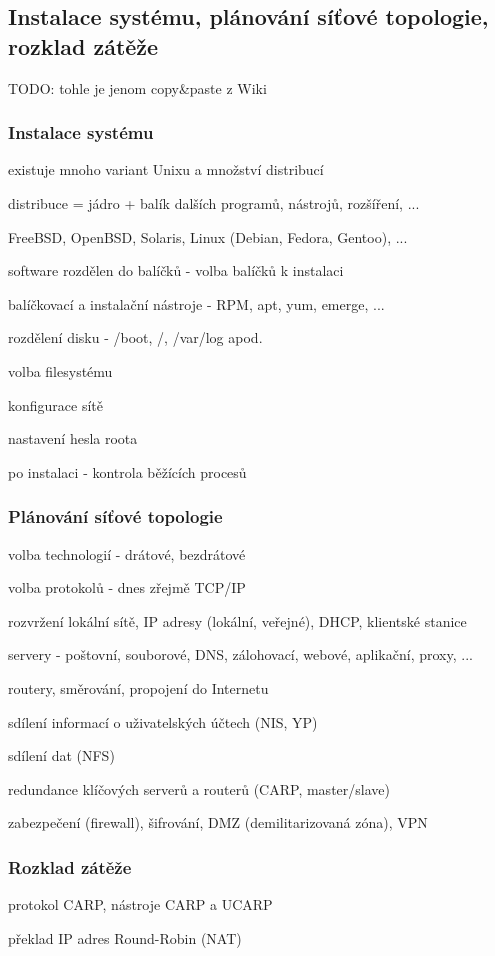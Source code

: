 \subsection{Instalace systému, plánování síťové topologie, rozklad zátěže}

TODO: tohle je jenom copy\&paste z Wiki

\subsubsection*{Instalace systému}

\begin{pitemize}
    \item existuje mnoho variant Unixu a množství distribucí
    \item distribuce = jádro + balík dalších programů, nástrojů, rozšíření, ...
    \item FreeBSD, OpenBSD, Solaris, Linux (Debian, Fedora, Gentoo), ...
    \item software rozdělen do balíčků - volba balíčků k instalaci
    \item balíčkovací a instalační nástroje - RPM, apt, yum, emerge, ...
    \item rozdělení disku - /boot, /, /var/log apod.
    \item volba filesystému
    \item konfigurace sítě
    \item nastavení hesla roota
    \item po instalaci - kontrola běžících procesů 
\end{pitemize}

\subsubsection*{Plánování síťové topologie}

\begin{pitemize}
    \item volba technologií - drátové, bezdrátové
    \item volba protokolů - dnes zřejmě TCP/IP
    \item rozvržení lokální sítě, IP adresy (lokální, veřejné), DHCP, klientské stanice
    \item servery - poštovní, souborové, DNS, zálohovací, webové, aplikační, proxy, ...
    \item routery, směrování, propojení do Internetu
    \item sdílení informací o uživatelských účtech (NIS, YP)
    \item sdílení dat (NFS)
    \item redundance klíčových serverů a routerů (CARP, master/slave)
    \item zabezpečení (firewall), šifrování, DMZ (demilitarizovaná zóna), VPN 
\end{pitemize}

\subsubsection*{Rozklad zátěže}

\begin{pitemize}
    \item protokol CARP, nástroje CARP a UCARP
    \item překlad IP adres Round-Robin (NAT)
\end{pitemize}

